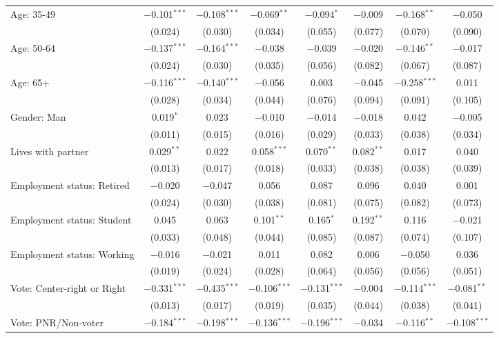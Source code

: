 \begin{tabular}{@{\extracolsep{5pt}}lccccccc}
  Age: 35-49 & $-$0.101$^{***}$ & $-$0.108$^{***}$ & $-$0.069$^{**}$ & $-$0.094$^{*}$ & $-$0.009 & $-$0.168$^{**}$ & $-$0.050 \\ 
  & (0.024) & (0.030) & (0.034) & (0.055) & (0.077) & (0.070) & (0.090) \\ 
  Age: 50-64 & $-$0.137$^{***}$ & $-$0.164$^{***}$ & $-$0.038 & $-$0.039 & $-$0.020 & $-$0.146$^{**}$ & $-$0.017 \\ 
  & (0.024) & (0.030) & (0.035) & (0.056) & (0.082) & (0.067) & (0.087) \\ 
  Age: 65+ & $-$0.116$^{***}$ & $-$0.140$^{***}$ & $-$0.056 & 0.003 & $-$0.045 & $-$0.258$^{***}$ & 0.011 \\ 
  & (0.028) & (0.034) & (0.044) & (0.076) & (0.094) & (0.091) & (0.105) \\ 
  Gender: Man & 0.019$^{*}$ & 0.023 & $-$0.010 & $-$0.014 & $-$0.018 & 0.042 & $-$0.005 \\ 
  & (0.011) & (0.015) & (0.016) & (0.029) & (0.033) & (0.038) & (0.034) \\ 
  Lives with partner & 0.029$^{**}$ & 0.022 & 0.058$^{***}$ & 0.070$^{**}$ & 0.082$^{**}$ & 0.017 & 0.040 \\ 
  & (0.013) & (0.017) & (0.018) & (0.033) & (0.038) & (0.038) & (0.039) \\ 
  Employment status: Retired & $-$0.020 & $-$0.047 & 0.056 & 0.087 & 0.096 & 0.040 & 0.001 \\ 
  & (0.024) & (0.030) & (0.038) & (0.081) & (0.075) & (0.082) & (0.073) \\ 
  Employment status: Student & 0.045 & 0.063 & 0.101$^{**}$ & 0.165$^{*}$ & 0.192$^{**}$ & 0.116 & $-$0.021 \\ 
  & (0.033) & (0.048) & (0.044) & (0.085) & (0.087) & (0.074) & (0.107) \\ 
  Employment status: Working & $-$0.016 & $-$0.021 & 0.011 & 0.082 & 0.006 & $-$0.050 & 0.036 \\ 
  & (0.019) & (0.024) & (0.028) & (0.064) & (0.056) & (0.056) & (0.051) \\ 
  Vote: Center-right or Right & $-$0.331$^{***}$ & $-$0.435$^{***}$ & $-$0.106$^{***}$ & $-$0.131$^{***}$ & $-$0.004 & $-$0.114$^{***}$ & $-$0.081$^{**}$ \\ 
  & (0.013) & (0.017) & (0.019) & (0.035) & (0.044) & (0.038) & (0.041) \\ 
  Vote: PNR/Non-voter & $-$0.184$^{***}$ & $-$0.198$^{***}$ & $-$0.136$^{***}$ & $-$0.196$^{***}$ & $-$0.034 & $-$0.116$^{**}$ & $-$0.108$^{***}$ \\ 

\end{tabular}
